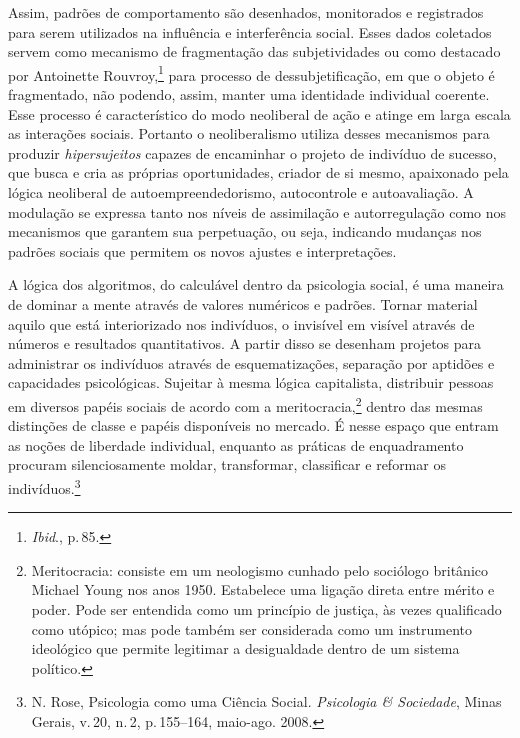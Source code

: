 Assim, padrões de comportamento são desenhados, monitorados e
registrados para serem utilizados na influência e interferência social.
Esses dados coletados servem como mecanismo de fragmentação das
subjetividades ou como destacado por Antoinette Rouvroy,\footnote{\textit{Ibid}., p.\,85.} para processo de dessubjetificação, em que o objeto é
fragmentado, não podendo, assim, manter uma identidade individual
coerente. Esse processo é característico do modo neoliberal de ação e
atinge em larga escala as interações sociais. Portanto o neoliberalismo
utiliza desses mecanismos para produzir \textit{hipersujeitos} capazes de
encaminhar o projeto de indivíduo de sucesso, que busca e cria as
próprias oportunidades, criador de si mesmo, apaixonado pela lógica
neoliberal de autoempreendedorismo, autocontrole e autoavaliação. A
modulação se expressa tanto nos níveis de assimilação e autorregulação
como nos mecanismos que garantem sua perpetuação, ou seja, indicando
mudanças nos padrões sociais que permitem os novos ajustes e
interpretações.

A lógica dos algoritmos, do calculável dentro da psicologia social, é
uma maneira de dominar a mente através de valores numéricos e padrões.
Tornar material aquilo que está interiorizado nos indivíduos, o
invisível em visível através de números e resultados quantitativos. A
partir disso se desenham projetos para administrar os indivíduos através
de esquematizações, separação por aptidões e capacidades psicológicas.
Sujeitar à mesma lógica capitalista, distribuir pessoas em diversos
papéis sociais de acordo com a meritocracia,\footnote{Meritocracia:
  consiste em um neologismo cunhado pelo sociólogo britânico Michael
  Young nos anos 1950. Estabelece uma ligação direta entre mérito e
  poder. Pode ser entendida como um princípio de justiça, às vezes
  qualificado como utópico; mas pode também ser considerada como um
  instrumento ideológico que permite legitimar a desigualdade dentro de
  um sistema político.} dentro das mesmas distinções de classe e papéis
disponíveis no mercado. É nesse espaço que entram as noções de liberdade
individual, enquanto as práticas de enquadramento procuram
silenciosamente moldar, transformar, classificar e reformar os
indivíduos.\footnote{N. Rose, Psicologia como uma Ciência Social. \textit{Psicologia
\& Sociedade}, Minas Gerais, v.\,20, n.\,2, p.\,155--164,  maio-ago. 2008.}

